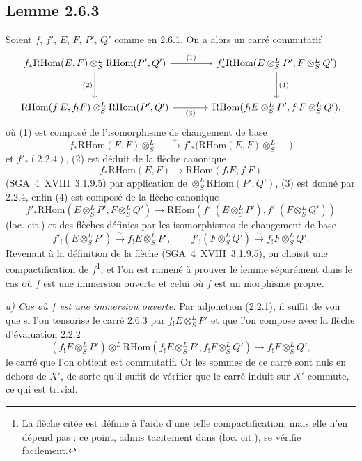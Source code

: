 \documentclass[11pt]{article}
\providecommand{\RHom}{\mathrm{RHom}}
\providecommand{\RHom}{\mathrm{RHom}}
\begin{document}
\subsection*{Lemme 2.6.3}
Soient $f$, $f'$, $E$, $F$, $P'$, $Q'$ comme en 2.6.1. On a alors un carré commutatif
\[
\begin{tikzcd}[column sep=large,row sep=large]
f_*\RHom(E,F)\otimes^L_S\RHom(P',Q') \arrow[r,"(1)"] \arrow[d,"(2)"'] & f'_*\RHom(E\otimes^L_SP',F\otimes^L_SQ') \arrow[d,"(4)"]\\
\RHom(f_!E,f_!F)\otimes^L_S\RHom(P',Q') \arrow[r,"(3)"'] & \RHom(f_!E\otimes^L_SP',f_!F\otimes^L_SQ'),
\end{tikzcd}
\]
où (1) est composé de l'isomorphisme de changement de base
\[
f_*\RHom(E,F)\otimes^L_S -\xrightarrow{\sim}f'_*\bigl(\RHom(E,F)\otimes^L_S-\bigr)
\]
et $f'_*(2.2.4)$, (2) est déduit de la flèche canonique
\[
f_*\RHom(E,F)\longrightarrow\RHom(f_!E,f_!F)
\]
(SGA~4~XVIII~3.1.9.5) par application de $\otimes^L_S\RHom(P',Q')$, (3) est donné par 2.2.4, enfin (4) est composé de la flèche canonique
\[
f'_*\RHom(E\otimes^L_SP',F\otimes^L_SQ')
\longrightarrow
\RHom(f'_!(E\otimes^L_SP'),f'_!(F\otimes^L_SQ'))
\]
(loc. cit.) et des flèches définies par les isomorphismes de changement de base
\[
f'_!(E\otimes^L_SP')\xrightarrow{\sim}f_!E\otimes^L_SP',
\qquad
f'_!(F\otimes^L_SQ')\xrightarrow{\sim}f_!F\otimes^L_SQ'.
\]
Revenant à la définition de la flèche (SGA~4~XVIII~3.1.9.5), on choisit une compactification de $f$\footnote{La flèche citée est définie à l'aide d'une telle compactification, mais elle n'en dépend pas : ce point, admis tacitement dans (loc. cit.), se vérifie facilement.}, et l'on est ramené à prouver le lemme séparément dans le cas où $f$ est une immersion ouverte et celui où $f$ est un morphisme propre.

\emph{a) Cas où $f$ est une immersion ouverte.} Par adjonction (2.2.1), il suffit de voir que si l'on tensorise le carré 2.6.3 par $f_!E\otimes^L_SP'$ et que l'on compose avec la flèche d'évaluation 2.2.2
\[
(f_!E\otimes^L_SP')\otimes^L\RHom(f_!E\otimes^L_SP',f_!F\otimes^L_SQ')\longrightarrow f_!F\otimes^L_SQ',
\]
le carré que l'on obtient est commutatif. Or les sommes de ce carré sont nuls en dehors de $X'$, de sorte qu'il suffit de vérifier que le carré induit sur $X'$ commute, ce qui est trivial.
\end{document}
